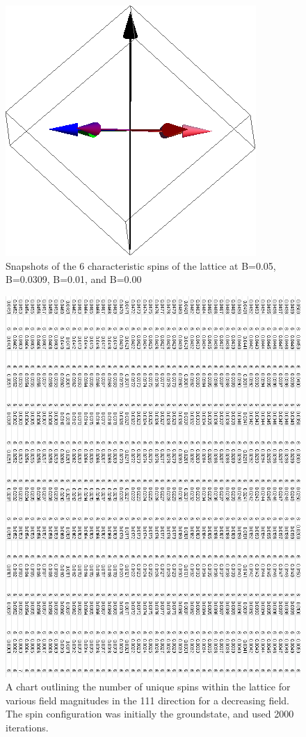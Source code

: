 \documentclass{article}
\begin{document}
\begin{figure}[ht]
\includegraphics[scale=0.28]{111_2000/4S005to000G.png}
\caption{Snapshots of the 6 characteristic spins of the lattice at B=0.05, B=0.0309, B=0.01, and B=0.00}
\end{figure}
\clearpage

\begin{figure}[ht]
\centering
 \includegraphics[keepaspectratio,scale=0.75]{111_2000/005to000SpinChart.png}
   \caption{A chart outlining the number of unique spins within the lattice for various field magnitudes in the 111
   direction for a decreasing field. The spin configuration was initially the groundstate, and used 2000 iterations.}
\end{figure}
\clearpage
\end{document}
